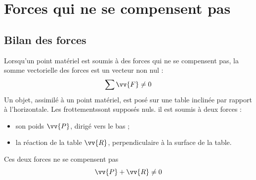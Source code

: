 \documentclass[a4paper,11pt,fleqn]{scrartcl}%
\begin{document}
	\maketitle
\section{Forces qui ne se compensent pas}
    \subsection{Bilan des forces}
        Lorsqu'un point matériel est soumis à des forces qui ne se compensent pas, la somme vectorielle des forces est un vecteur non nul : 
        $$\sum \vv{F} \neq 0$$
        Un objet, assimilé à un point matériel, est posé sur une table inclinée par rapport à l'horizontale. Les frottementssont supposés nuls. il est soumis à deux forces :
        \begin{itemize}
            \item son poids $\vv{P}$, dirigé vers le bas ;
            \item la réaction de la table $\vv{R}$, perpendiculaire à la surface de la table.
        \end{itemize}
        Ces deux forces ne se compensent pas  $$\vv{P} + \vv{R} \neq 0$$
        \begin{minipage}{0.45\textwidth}
        \begin{center}
        \end{center}
        \end{minipage}
\end{document}

